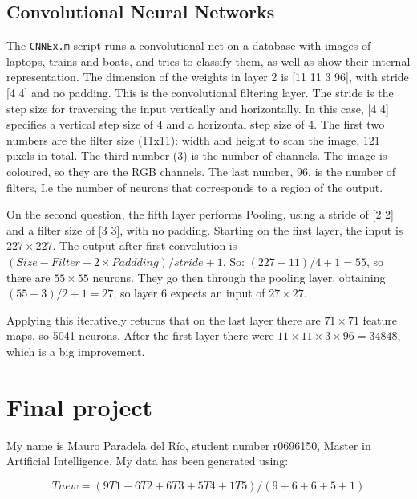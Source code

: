\documentclass[a4paper, 10pt]{article}
\begin{document}
  \subsection{Convolutional Neural Networks}
  The \texttt{CNNEx.m} script runs a convolutional net on a database with images
  of laptops, trains and boats, and tries to classify them, as well as show their
  internal representation. The dimension of the weights in layer 2 is [11 11 3 
  96],  with stride [4 4] and no padding. This is the convolutional filtering 
  layer.  The stride is the step size for 
  traversing the input vertically and horizontally. In this case, [4 4] 
  specifies a vertical step size of 4 and a horizontal step size of 4.
  The first two numbers are the filter size (11x11):  width and height 
  to scan the image, 121 pixels in total. The third number (3) is the number 
  of channels. The image is coloured, so they are the RGB channels. 
  The last number, 96, is the number of filters, I.e  the number of neurons 
  that corresponds to a region of the output.  

  On the second question, the fifth layer performs Pooling, using a stride of
  [2 2] and a filter size of  [3 3], with no padding. Starting on the first 
  layer, the input is $227 \times 227$.
  The output after first convolution is $(Size - Filter + 2 \times Paddding)/
  stride + 1$. So: $(227 - 11) / 4 + 1 = 55$, so there are $55 \times 55$ 
  neurons. They go then through the pooling layer, 
  obtaining $(55 - 3)/2 + 1 = 27$, so layer 6 expects an input of $27 \times 27$.

  Applying this iteratively returns that on the last layer there are
  $71 \times 71$ feature maps, so 5041 neurons. After the first layer there 
  were $11 \times 11 \times 3 \times 96 =34848$, which is a big improvement.
  \newpage

\section{Final project}
My name is Mauro Paradela del Río, student number r0696150, Master in Artificial
Intelligence. My data has been generated using:

$$ Tnew = (9T1 + 6T2 + 6T3 + 5T4 + 1T5) / (9 + 6 + 6+ 5 + 1) $$
\end{document}
